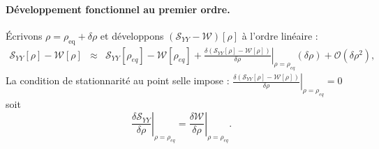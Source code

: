 \paragraph{Développement fonctionnel au premier ordre.}

Écrivons
\(
\rho=\rho_{\text{eq}}+\delta\rho
\)
et développons $(\mathcal{S}_{YY}-\mathcal{W})[\rho]$ à l’ordre linéaire :
\begin{eqnarray*}
	\mathcal{S}_{YY}[\rho] - \mathcal{W}[\rho] & \approx & \mathcal{S}_{YY}[ \rho_{eq}] - \mathcal{W}[ \rho_{eq}] +  \left. \frac{\delta (\mathcal{S}_{YY}[\rho] - \mathcal{W}[\rho]) }{\delta \rho} \right|_{\rho = \rho_{eq} }	(\delta \rho) + \mathcal{O}(\delta \rho^2 ) ,
	\label{chap:TBA:eq:action}	
\end{eqnarray*}	
La condition de stationnarité au point selle impose :
\(
	\left. \frac{\delta (\mathcal{S}_{YY}[\rho] - \mathcal{W}[\rho]) }{\delta \rho} \right|_{\rho = \rho_{eq} }	  =  0  	
\)
soit 
\begin{equation}
\left. \frac{\delta \mathcal{S}_{YY}}{\delta \rho} \right|_{\rho = \rho_{eq}} = \left. \frac{\delta \mathcal{W}}{\delta \rho} \right|_{\rho = \rho_{eq}}. \label{chap:TBA:eq:stationnarite}
\end{equation}




%

